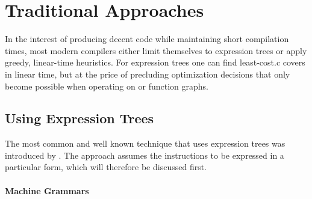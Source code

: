 \section{Traditional Approaches}

In the interest of producing decent code while maintaining short compilation
times, most modern \glspl{compiler} either limit themselves to \glspl{expression
  tree} or apply greedy, linear-time heuristics.
%
For \glspl{expression tree} one can find \gls{least-cost.c} \glspl{cover} in
linear time, but at the price of precluding optimization decisions that only
become possible when operating on  or \glspl{function
  graph}.



\subsection{Using Expression Trees}

The most common and well known technique that uses \glspl{expression tree} was
introduced by \textcite{AhoEtAl:1989}.
%
The approach assumes the \glspl{instruction} to be expressed in a particular
form, which will therefore be discussed first.



\paragraph{Machine Grammars}

